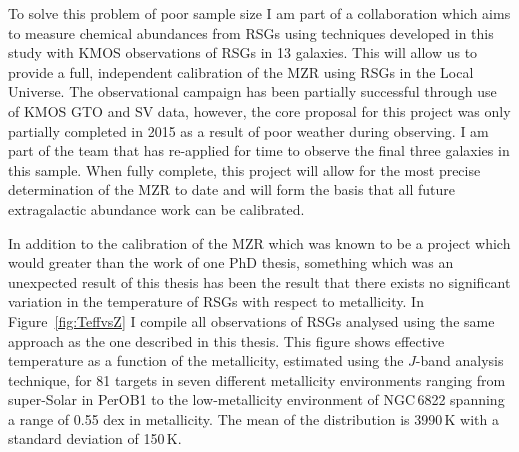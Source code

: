 To solve this problem of poor sample size I am part of a collaboration which aims to measure chemical abundances from RSGs using techniques developed in this study with KMOS observations of RSGs in 13 galaxies.
This will allow us to provide a full, independent calibration of the MZR using RSGs in the Local Universe.
The observational campaign has been partially successful through use of KMOS GTO and SV data, however, the core proposal for this project was only partially completed in 2015 as a result of poor weather during observing.
I am part of the team that has re-applied for time to observe the final three galaxies in this sample.
When fully complete, this project will allow for the most precise determination of the MZR to date and will form the basis that all future extragalactic abundance work can be calibrated.


In addition to the calibration of the MZR which was known to be a project which would greater than the work of one PhD thesis, something which was an unexpected result of this thesis has been the result that there exists no significant variation in the temperature of RSGs with respect to metallicity.
In Figure~\ref{fig:TeffvsZ} I compile all observations of RSGs analysed using the same approach as the one described in this thesis.
This figure shows effective temperature as a function of the metallicity, estimated using the $J$-band analysis technique, for 81 targets in seven different metallicity environments ranging from super-Solar in PerOB1 to the low-metallicity environment of NGC\,6822 spanning a range of 0.55 dex in metallicity.
The mean of the distribution is 3990\,K with a standard deviation of 150\,K.


